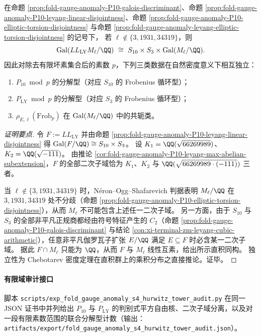 \begin{corollary}\label{cor:fold-gauge-anomaly-P10-leyang-elliptic-triple-independence}
在命题 \ref{prop:fold-gauge-anomaly-P10-galois-discriminant}、命题 \ref{prop:fold-gauge-anomaly-P10-leyang-linear-disjointness}、命题 \ref{prop:fold-gauge-anomaly-P10-elliptic-torsion-disjointness} 与命题 \ref{prop:fold-gauge-anomaly-leyang-elliptic-torsion-disjointness} 的记号下，
若 \(\ell\notin\{3,1931,34319\}\)，则
\[
\mathrm{Gal}(LL_{\mathrm{LY}}M_\ell/\QQ)
\ \cong\
S_{10}\times S_{3}\times \mathrm{Gal}(M_\ell/\QQ).
\]
因此对除去有限坏素集合后的素数 \(p\)，下列三类数据在自然密度意义下相互独立：
\begin{enumerate}
  \item \(P_{10}\bmod p\) 的分解型（对应 \(S_{10}\) 的 Frobenius 循环型）；
  \item \(P_{\mathrm{LY}}\bmod p\) 的分解型（对应 \(S_{3}\) 的 Frobenius 循环型）；
  \item \(\rho_{E,\ell}(\mathrm{Frob}_p)\) 在 \(\mathrm{Gal}(M_\ell/\QQ)\) 中的共轭类。
\end{enumerate}
\end{corollary}
\begin{proof}[证明要点]
令 \(F:=LL_{\mathrm{LY}}\) 并由命题 \ref{prop:fold-gauge-anomaly-P10-leyang-linear-disjointness} 得 \(\mathrm{Gal}(F/\QQ)\cong S_{10}\times S_3\)。
设 \(K_1=\QQ(\sqrt{66269989})\)、\(K_2=\QQ(\sqrt{-111})\)。
由推论 \ref{cor:fold-gauge-anomaly-P10-leyang-max-abelian-subextension}，\(F\) 的全部二次子域恰为 \(K_1\)、\(K_2\) 与 \(\QQ(\sqrt{66269989\cdot(-111)})\) 三者。
\par
当 \(\ell\notin\{3,1931,34319\}\) 时，N\'eron--Ogg--Shafarevich 判据表明 \(M_\ell/\QQ\) 在 \(3,1931,34319\) 处不分歧（命题 \ref{prop:fold-gauge-anomaly-P10-elliptic-torsion-disjointness}），从而 \(M_\ell\) 不可能包含上述任一二次子域。
另一方面，由于 \(S_{10}\) 与 \(S_3\) 的全部非平凡正规商都经由符号特征产生的 \(C_2\)（命题 \ref{prop:fold-gauge-anomaly-P10-galois-discriminant} 与结论 \ref{con:xi-terminal-zm-leyang-cubic-arithmetic}），任意非平凡伽罗瓦子扩张 \(E/\QQ\) 满足 \(E\subseteq F\) 时必含某一二次子域。
据此 \(F\cap M_\ell\) 只能为 \(\QQ\)，从而 \(F\) 与 \(M_\ell\) 线性互素，给出所示直积同构。
独立性为 Chebotarev 密度定理在直积群上的乘积分布之直接推论。证毕。
\end{proof}

\paragraph{有限域审计接口}
脚本 \texttt{scripts/exp\_fold\_gauge\_anomaly\_s4\_hurwitz\_tower\_audit.py} 在同一 JSON 证书中并列给出 \(P_{10}\) 与 \(P_{\mathrm{LY}}\) 的判别式平方自由核、二次子域分离，以及对一段有限素数范围的联合分解型计数（输出：\texttt{artifacts/export/fold\_gauge\_anomaly\_s4\_hurwitz\_tower\_audit.json}）。

\endinput

